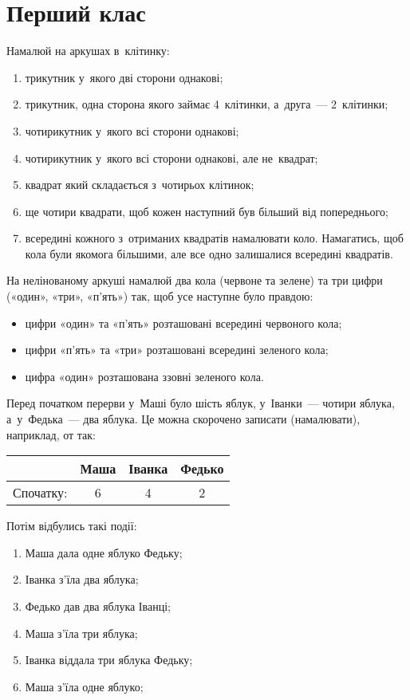 \chapter{Перший клас}


\problem
Намалюй на аркушах в~клітинку:
\begin{enumerate}
    \item трикутник у~якого дві сторони однакові;
    \item трикутник, одна сторона якого займає 4~клітинки, а~друга~---
    2~клітинки;
    \item чотирикутник у~якого всі сторони однакові;
    \item чотирикутник у~якого всі сторони однакові, але не~квадрат;
    \item квадрат який складається з~чотирьох клітинок;
    \item ще чотири квадрати, щоб кожен наступний був більший від попереднього;
    \item всередині кожного з~отриманих квадратів намалювати коло.
    Намагатись, щоб кола були якомога більшими,
    але все одно залишалися всередині квадратів.
\end{enumerate}


\problem
На нелінованому аркуші намалюй два кола (червоне та зелене)
та три цифри («один», «три», «п'ять») так,
щоб усе наступне було правдою:
\begin{itemize}
    \item цифри «один» та «п'ять» розташовані всередині червоного кола;
    \item цифри «п'ять» та «три» розташовані всередині зеленого кола;
    \item цифра «один» розташована ззовні зеленого кола.
\end{itemize}


\problem
Перед початком перерви у~Маші було шість яблук,
у~Іванки~--- чотири яблука, а~у~Федька~--- два яблука.
Це можна скорочено записати (намалювати), наприклад, от так:

\medskip

\begin{tabular}{|r|c|c|c|}
\hline
& Маша & Іванка & Федько \\
\hline
Спочатку: & 6 & 4 & 2 \\
\hline
\end{tabular}

\medskip

Потім відбулись такі події:
\begin{enumerate}
    \item Маша дала одне яблуко Федьку;
    \item Іванка з'їла два яблука;
    \item Федько дав два яблука Іванці;
    \item Маша з'їла три яблука;
    \item Іванка віддала три яблука Федьку;
    \item Маша з'їла одне яблуко;
\end{enumerate}

